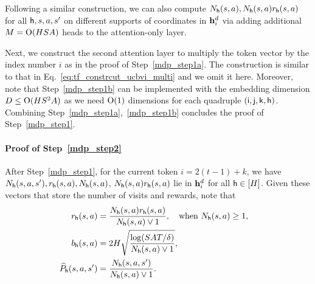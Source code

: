 Following a similar construction, we can also compute ${N}_{\mathsf{h}}({s},{a}),{N}_{\mathsf{h}}({s},{a}){r}_{\mathsf{h}}({s},{a})$ for all ${\mathsf{h}},{s},{a},{s}'$ on different supports of coordinates in ${\mathbf h}_i^{d}$ via adding additional ${M}={\mathrm{O}}({H}{S}{A})$ heads to the attention-only layer.


Next, we construct the second attention layer to multiply the token vector by the index number $i$ as in the proof of Step~\ref{mdp_step1a}. The construction is similar to that in Eq.~\eqref{eq:tf_constrcut_ucbvi_multi} and we omit it here. Moreover, note that Step~\ref{mdp_step1b} can be implemented with the embedding dimension $D\leq{\mathrm{O}}({H}{S}^2{A})$ as we need ${\mathrm{O}}(1)$ dimensions for each quadruple $({\mathsf{i}},{\mathsf{j}},{\mathsf{k}},{\mathsf{h}})$.  Combining Step~\ref{mdp_step1a},~\ref{mdp_step1b} concludes the proof of Step~\ref{mdp_step1}.









 
\paragraph{Proof of Step~\ref{mdp_step2}}
After Step~\ref{mdp_step1}, for the current token $i=2(t-1)+k$, we have ${N}_{\mathsf{h}}({s},{a},{s}'),{r}_{\mathsf{h}}({s},{a}),{N}_{\mathsf{h}}({s},{a})$, ${N}_{\mathsf{h}}({s},{a}){r}_{\mathsf{h}}({s},{a})$  lie in ${\mathbf h}_i^{d}$ for all ${\mathsf{h}}\in[{H}]$. Given these vectors that store the number of visits and rewards, note that
\begin{align*}
{r}_{\mathsf{h}}({s},{a})&=\frac{{N}_{\mathsf{h}}({s},{a}){r}_{\mathsf{h}}({s},{a})}{{N}_{\mathsf{h}}({s},{a})\vee1},~~\text{ when  } {N}_{\mathsf{h}}({s},{a})\geq1,~~~\\
{b}_{\mathsf{h}}({s},{a})
&=2{H}\sqrt{\frac{\log({S}{A}{T}/\delta)}{{N}_{\mathsf{h}}({s},{a})\vee1}},
\\
\widehat{P}_{\mathsf{h}}({s},{a},{s}')
&=\frac{{N}_{\mathsf{h}}({s},{a},{s}')}{{N}_{\mathsf{h}}({s},{a})\vee 1}.
\end{align*}

